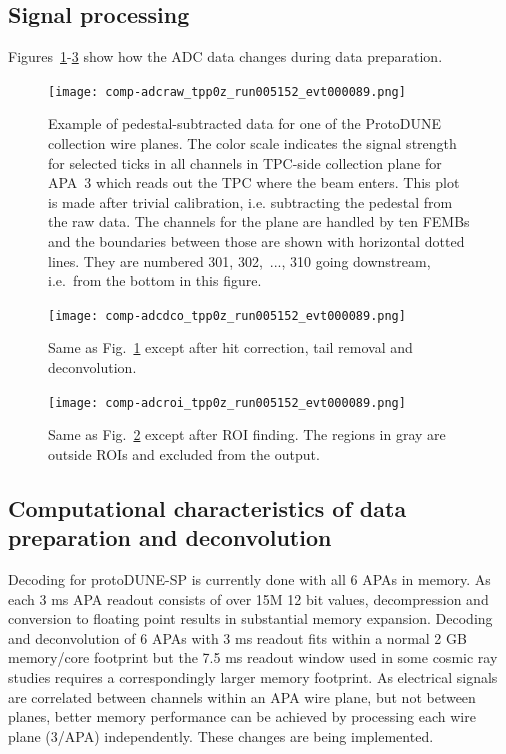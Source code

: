 \subsection{Signal processing}
Figures~\ref{fig:ch-exec-comp-chtraw}-\ref{fig:ch-exec-comp-chtroi} show how the ADC data changes during data
preparation.

\begin{figure}[t]
\texttt{[image: comp-adcraw\_tpp0z\_run005152\_evt000089.png]}
\caption{
Example of pedestal-subtracted data for one of the ProtoDUNE collection wire planes.
The color scale indicates the signal strength for selected ticks in all channels
in TPC-side collection plane for APA~3 which reads out the TPC where the beam enters.
This plot is made after trivial calibration, i.e. subtracting the pedestal from the raw data.
The channels for the plane are handled by ten FEMBs and the boundaries between those
are shown with horizontal dotted lines. They are numbered 301, 302,~..., 310 going
downstream, i.e.\ from the bottom in this figure.
}
\label{fig:ch-exec-comp-chtraw}
\end{figure}




\begin{figure}[t]
  \texttt{[image: comp-adcdco\_tpp0z\_run005152\_evt000089.png]}
\caption{
Same as Fig.~\ref{fig:ch-exec-comp-chtraw} except after hit correction, tail removal and deconvolution.
}
\label{fig:ch-exec-comp-chtdco}
\end{figure}

\begin{figure}[t]
  \texttt{[image: comp-adcroi\_tpp0z\_run005152\_evt000089.png]}
\caption{
Same as Fig.~\ref{fig:ch-exec-comp-chtdco} except after ROI finding. The regions in gray are
outside ROIs and excluded from the output.
}
\label{fig:ch-exec-comp-chtroi}
\end{figure}


\subsection{Computational characteristics of data preparation and deconvolution }
Decoding for protoDUNE-SP is currently done with all 6 APAs in memory. As each 3 ms APA readout consists of over 15M 12 bit values, decompression and conversion to floating point results in substantial memory expansion.  Decoding and deconvolution of 6 APAs with 3 ms readout fits within a normal 2 GB memory/core footprint but the 7.5 ms readout window used in some cosmic ray studies requires a correspondingly larger memory footprint. As electrical signals are correlated between channels within an APA wire plane, but not between planes, better memory performance can be achieved by processing each wire plane (3/APA) independently. These changes are being implemented.


